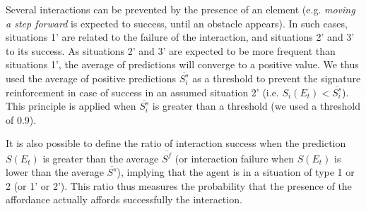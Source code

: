 \documentclass[conference]{IEEEtran}
\begin{document}
Several interactions can be prevented by the presence of an element (e.g. \textit{moving a step forward} is expected to success, until an obstacle appears). In such cases, situations 1' are related to the failure of the interaction, and situations 2' and 3' to its success. As situations 2' and 3' are expected to be more frequent than situations 1', the average of predictions will converge to a positive value. We thus used the average of positive predictions $\overline{S_i^s}$ as a threshold to prevent the signature reinforcement in case of success in an assumed situation 2' (i.e. $S_i(E_t)<\overline{S_i^s}$). This principle is applied when $\overline{S_i^s}$ is greater than a threshold (we used a threshold of 0.9).



It is also possible to define the ratio of interaction success when the prediction $S(E_t)$ is greater than the average $\overline{S^f}$ (or interaction failure when $S(E_t)$ is lower than the average $\overline{S^s}$), implying that the agent is in a situation of type 1 or 2 (or 1' or 2'). This ratio thus measures the probability that the presence of the affordance actually affords successfully the interaction.










\end{document}
